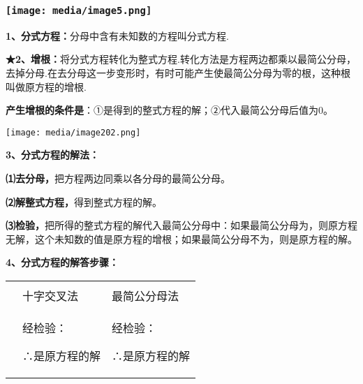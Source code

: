 \documentclass[a4paper,11pt,UTF8]{ctexart}
\begin{document}
\hypertarget{ux5b66ux79d1ux7f51www.zxxk.com--ux6559ux80b2ux8d44ux6e90ux95e8ux6237ux63d0ux4f9bux8bd5ux9898ux8bd5ux5377ux6559ux6848ux8bfeux4ef6ux6559ux5b66ux8bbaux6587ux7d20ux6750ux7b49ux5404ux7c7bux6559ux5b66ux8d44ux6e90ux5e93ux4e0bux8f7dux8fd8ux6709ux5927ux91cfux4e30ux5bccux7684ux6559ux5b66ux8d44ux8baf-36}{%
\subsubsection{\texorpdfstring{\protect\texttt{[image: media/image5.png]}}{学科网(www.zxxk.com)-\/-教育资源门户，提供试题试卷、教案、课件、教学论文、素材等各类教学资源库下载，还有大量丰富的教学资讯！}}\label{ux5b66ux79d1ux7f51www.zxxk.com--ux6559ux80b2ux8d44ux6e90ux95e8ux6237ux63d0ux4f9bux8bd5ux9898ux8bd5ux5377ux6559ux6848ux8bfeux4ef6ux6559ux5b66ux8bbaux6587ux7d20ux6750ux7b49ux5404ux7c7bux6559ux5b66ux8d44ux6e90ux5e93ux4e0bux8f7dux8fd8ux6709ux5927ux91cfux4e30ux5bccux7684ux6559ux5b66ux8d44ux8baf-36}}

\textbf{1、分式方程：}分母中含有未知数的方程叫分式方程.

\textbf{★2、增根：}将分式方程转化为整式方程.转化方法是方程两边都乘以最简公分母，去掉分母.在去分母这一步变形时，有时可能产生使最简公分母为零的根，这种根叫做原方程的增根.

\textbf{产生增根的条件是}：①是得到的整式方程的解；②代入最简公分母后值为0。

\texttt{[image: media/image202.png]}

\textbf{3、分式方程的解法：}

\textbf{⑴去分母，}把方程两边同乘以各分母的最简公分母。

\textbf{⑵解整式方程，}得到整式方程的解。

\textbf{⑶检验，}把所得的整式方程的解代入最简公分母中：如果最简公分母为，则原方程无解，这个未知数的值是原方程的增根；如果最简公分母不为，则是原方程的解。

\textbf{4、分式方程的解答步骤：}

\begin{longtable}[]{@{}lll@{}}
\toprule
\endhead
& &\tabularnewline
& 十字交叉法 & 最简公分母法\tabularnewline
\begin{minipage}[t]{0.30\columnwidth}\raggedright
\strut
\end{minipage} & \begin{minipage}[t]{0.30\columnwidth}\raggedright
经检验：

∴是原方程的解\strut
\end{minipage} & \begin{minipage}[t]{0.30\columnwidth}\raggedright
经检验：

∴是原方程的解\strut
\end{minipage}\tabularnewline
\bottomrule
\end{longtable}
\end{document}
